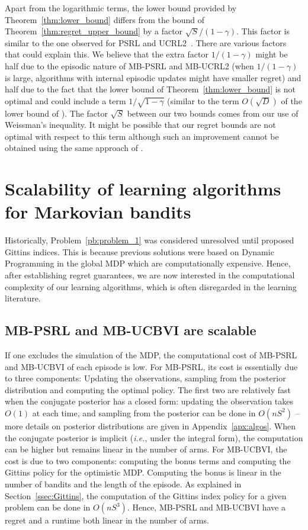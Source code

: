 Apart from the logarithmic terms, the lower bound provided by Theorem~\ref{thm:lower_bound} differs from the bound of Theorem~\ref{thm:regret_upper_bound} by a factor $\sqrt{S}/(1-\gamma)$. This factor is similar to the one observed for PSRL and UCRL2~\cite{osband2013more,jaksch2010near}. There are various factors that could explain this. We believe that the extra factor  $1/(1-\gamma)$ might be half due to the episodic nature of MB-PSRL and MB-UCRL2 (when $1/(1-\gamma)$ is large, algorithms with internal episodic updates might have smaller regret) and half due to the fact that the lower bound of Theorem~\ref{thm:lower_bound} is not optimal and could include a term $1/\sqrt{1-\gamma}$ (similar to the term $O(\sqrt{D})$ of the lower bound of \cite{osband2016lower,jaksch2010near}). The factor $\sqrt{S}$ between our two bounds comes from our use of Weissman's inequality. It might be possible that our regret bounds  are not optimal with respect to this term although such an improvement cannot be obtained using the same approach of \cite{azar2017minimax}.

\section{Scalability of learning algorithms for Markovian bandits}

Historically, Problem~{\ref{pb:problem_1}} was considered unresolved until \cite{gittins1979bandit} proposed Gittins indices. This is because previous solutions were based on Dynamic Programming in the global MDP which are computationally expensive. Hence, after establishing regret guarantees, we are now interested in the computational complexity of our learning algorithms, which is often disregarded in the learning literature.

\subsection{MB-PSRL and MB-UCBVI are scalable}
\label{sec:OFU}

If one excludes the simulation of the MDP, the computational cost of MB-PSRL and MB-UCBVI of each episode is low. For MB-PSRL, its cost is essentially due to three components: Updating the observations, sampling from the posterior distribution and computing the optimal policy. The first two are relatively fast when the conjugate posterior has a closed form: updating the observation takes $O(1)$ at each time, and sampling from the posterior can be done in $O(nS^2)$ -- more details on posterior distributions are given in Appendix~\ref{apx:algos}. When the conjugate posterior is implicit (\emph{i.e.}, under the integral form), the computation can be higher but remains linear in the number of arms. For MB-UCBVI, the cost is due to two components: computing the bonus terms and computing the Gittins policy for the optimistic MDP. Computing the bonus is linear in the number of bandits and the length of the episode. As explained in Section~\ref{ssec:Gittins}, the computation of the Gittins index policy for a given problem can be done in $O(nS^3)$. Hence, MB-PSRL and MB-UCBVI have a regret and a runtime both linear in the number of arms.

